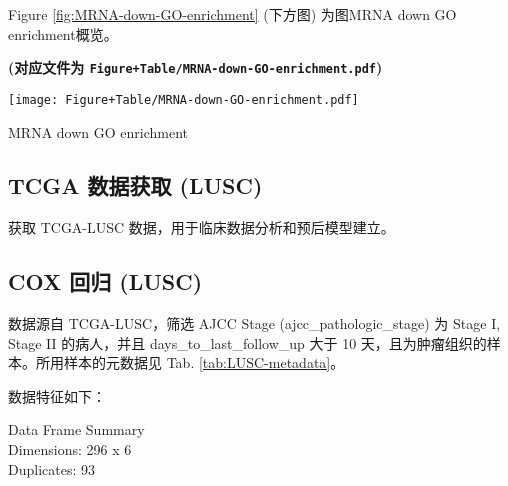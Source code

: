 \documentclass[
]{article}
\begin{document}
Figure \ref{fig:MRNA-down-GO-enrichment} (下方图) 为图MRNA down GO enrichment概览。

\textbf{(对应文件为 \texttt{Figure+Table/MRNA-down-GO-enrichment.pdf})}

\def\@captype{figure}
\begin{center}
\texttt{[image: Figure+Table/MRNA-down-GO-enrichment.pdf]}
\caption{MRNA down GO enrichment}\label{fig:MRNA-down-GO-enrichment}
\end{center}

\begin{center}\vspace{1.5cm}\end{center}

\hypertarget{tcga-ux6570ux636eux83b7ux53d6-lusc}{%
\subsection{TCGA 数据获取 (LUSC)}\label{tcga-ux6570ux636eux83b7ux53d6-lusc}}

获取 TCGA-LUSC 数据，用于临床数据分析和预后模型建立。

\hypertarget{cox-ux56deux5f52-lusc}{%
\subsection{COX 回归 (LUSC)}\label{cox-ux56deux5f52-lusc}}

数据源自 TCGA-LUSC，筛选 AJCC Stage (ajcc\_pathologic\_stage) 为 Stage I, Stage II 的病人，并且 days\_to\_last\_follow\_up 大于 10 天，且为肿瘤组织的样本。所用样本的元数据见 Tab. \ref{tab:LUSC-metadata}。

数据特征如下：

Data Frame Summary\\
Dimensions: 296 x 6\\
Duplicates: 93
\end{document}
